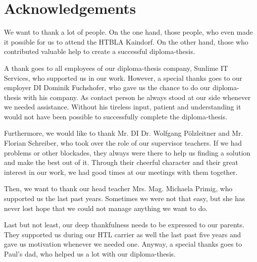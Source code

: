 \chapter*{Acknowledgements}
We want to thank a lot of people. On the one hand, those people, who even made it possible for us to attend the HTBLA Kaindorf. On the other hand, those who contributed valuable help to create a successful diploma-thesis.

A thank goes to all employees of our diploma-thesis company, Sunlime IT Services, who supported us in our work. However, a special thanks goes to our employer DI Dominik Fuchshofer, who gave us the chance to do our diploma-thesis with his company. As contact person he always stood at our side whenever we needed assistance. Without his tireless input, patient and understanding it would not have been possible to successfully complete the diploma-thesis.

Furthermore, we would like to thank Mr. DI Dr. Wolfgang Pölzleitner and Mr. Florian Schreiber, who took over the role of our supervisor teachers. If we had problems or other blockades, they always were there to help us finding a solution and make the best out of it. Through their cheerful character and their great interest in our work, we had good times at our meetings with them together.

Then, we want to thank our head teacher Mrs. Mag. Michaela Primig, who supported us the last past years. Sometimes we were not that easy, but she has never lost hope that we could not manage anything we want to do.

Last but not least, our deep thankfulness needs to be expressed to our parents. They supported us during our HTL carrier as well the last past five years and gave us motivation whenever we needed one. Anyway, a special thanks goes to Paul’s dad, who helped us a lot with our diploma-thesis.
